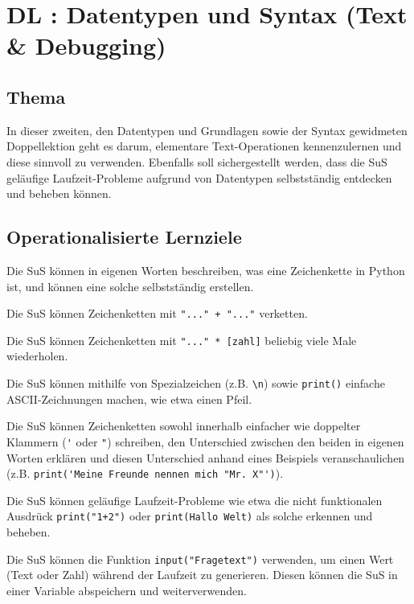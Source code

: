 \section{DL \themycounter: Datentypen und Syntax (Text \& Debugging)}
\begin{myExBox}[title=DL \themycounter]
\subsection*{Thema}
In dieser zweiten, den Datentypen und Grundlagen sowie der Syntax gewidmeten Doppellektion geht es darum, elementare Text-Operationen kennenzulernen und diese sinnvoll zu verwenden. Ebenfalls soll sichergestellt werden, dass die SuS geläufige Laufzeit-Probleme aufgrund von Datentypen selbstständig entdecken und beheben können.


\subsection*{Operationalisierte Lernziele}
\begin{todolist}
    \item Die SuS können in eigenen Worten beschreiben, was eine Zeichenkette in Python ist, und können eine solche selbstständig erstellen.
    \item Die SuS können Zeichenketten mit \lstinline|"..." + "..."| verketten.
    \item Die SuS können Zeichenketten mit \lstinline|"..." * [zahl]| beliebig viele Male wiederholen.
    \item Die SuS können mithilfe von Spezialzeichen (z.B. \lstinline|\n|) sowie \lstinline|print()| einfache ASCII-Zeichnungen machen, wie etwa einen Pfeil.
    \item Die SuS können Zeichenketten sowohl innerhalb einfacher wie doppelter Klammern (\lstinline|'| oder \lstinline|"|) schreiben, den Unterschied zwischen den beiden in eigenen Worten erklären und diesen Unterschied anhand eines Beispiels veranschaulichen (z.B. \lstinline|print('Meine Freunde nennen mich "Mr. X"')|).
    \item Die SuS können geläufige Laufzeit-Probleme wie etwa die nicht funktionalen Ausdrück \lstinline|print("1+2")| oder \lstinline|print(Hallo Welt)| als solche erkennen und beheben.
    \item Die SuS können die Funktion \lstinline|input("Fragetext")| verwenden, um einen Wert (Text oder Zahl) während der Laufzeit zu generieren. Diesen können die SuS in einer Variable abspeichern und weiterverwenden.
\end{todolist}


\end{myExBox}
